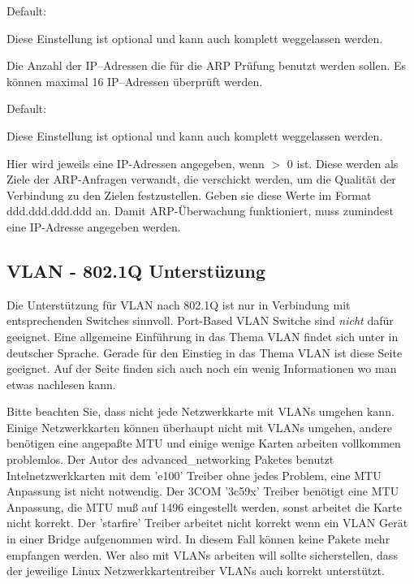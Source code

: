 \begin{description}
  Default: 

  Diese Einstellung ist optional und kann auch komplett weggelassen
  werden.

  Die Anzahl der IP--Adressen die für die ARP Prüfung benutzt werden
  sollen. Es können maximal 16 IP--Adressen überprüft werden.


  Default: 

  Diese Einstellung ist optional und kann auch komplett weggelassen
  werden.

  Hier wird jeweils eine IP-Adressen angegeben, wenn
   $>$ 0 ist. Diese werden als Ziele der
  ARP-Anfragen verwandt, die verschickt werden, um die Qualität der
  Verbindung zu den Zielen festzustellen. Geben sie diese Werte im
  Format ddd.ddd.ddd.ddd an. Damit ARP-Überwachung funktioniert, muss
  zumindest eine IP-Adresse angegeben werden.

\end{description}

{
\subsection {VLAN - 802.1Q Unterstüzung}
}

Die Unterstützung für VLAN nach 802.1Q ist nur in Verbindung mit
entsprechenden Switches sinnvoll. Port-Based VLAN Switche sind
\emph{nicht} dafür geeignet.  Eine allgemeine Einführung in das Thema
VLAN findet sich unter
in deutscher Sprache. Gerade für den Einstieg in das Thema VLAN ist
diese Seite geeignet. Auf der Seite
 finden sich auch noch ein
wenig Informationen wo man etwas nachlesen kann.

Bitte beachten Sie, dass nicht jede Netzwerkkarte mit VLANs umgehen
kann.  Einige Netzwerkkarten können überhaupt nicht mit VLANs umgehen,
andere benötigen eine angepaßte MTU und einige wenige Karten arbeiten
vollkommen problemlos. Der Autor des advanced\_networking Paketes
benutzt Intelnetzwerkkarten mit dem 'e100' Treiber ohne jedes Problem,
eine MTU Anpassung ist nicht notwendig. Der 3COM '3c59x' Treiber
benötigt eine MTU Anpassung, die MTU muß auf 1496 eingestellt werden,
sonst arbeitet die Karte nicht korrekt. Der 'starfire' Treiber
arbeitet nicht korrekt wenn ein VLAN Gerät in einer Bridge aufgenommen
wird. In diesem Fall können keine Pakete mehr empfangen werden. Wer
also mit VLANs arbeiten will sollte sicherstellen, dass der jeweilige
Linux Netzwerkkartentreiber VLANs auch korrekt unterstützt.

